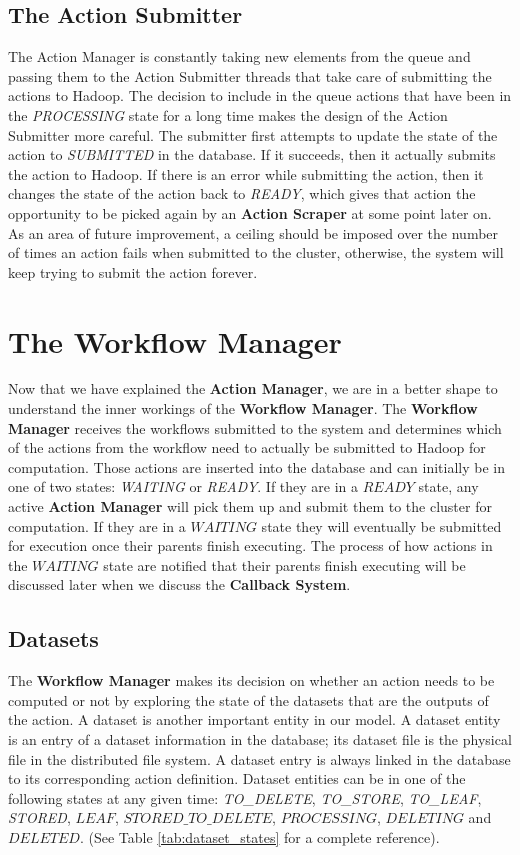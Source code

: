 \subsection{The Action Submitter}
The Action Manager is constantly taking new elements from the queue and passing them to the Action Submitter threads that take care of submitting the actions to Hadoop. The decision to include in the queue actions that have been in the \textit{PROCESSING} state for a long time makes the design of the Action Submitter more careful. The submitter first attempts to update the state of the action to \textit{SUBMITTED} in the database. If it succeeds, then it actually submits the action to Hadoop. If there is an error while submitting the action, then it changes the state of the action back to \textit{READY}, which gives that action the opportunity to be picked again by an \textbf{Action Scraper} at some point later on. As an area of future improvement, a ceiling should be imposed over the number of times an action fails when submitted to the cluster, otherwise, the system will keep trying to submit the action forever.

\section{The Workflow Manager}
Now that we have explained the \textbf{Action Manager}, we are in a better shape to understand the inner workings of the \textbf{Workflow Manager}. The \textbf{Workflow Manager} receives the workflows submitted to the system and determines which of the actions from the workflow need to actually be submitted to Hadoop for computation. Those actions are inserted into the database and can initially be in one of two states: \textit{WAITING} or \textit{READY}. If they are in a $READY$ state, any active \textbf{Action Manager} will pick them up and submit them to the cluster for computation. If they are in a $WAITING$ state they will eventually be submitted for execution once their parents finish executing. The process of how actions in the $WAITING$ state are notified that their parents finish executing will be discussed later when we discuss the \textbf{Callback System}.

\subsection{Datasets}
The \textbf{Workflow Manager} makes its decision on whether an action needs to be computed or not by exploring the state of the datasets that are the outputs of the action. A dataset is another important entity in our model. A dataset entity is an entry of a dataset information in the database; its dataset file is the physical file in the distributed file system. A dataset entry is always linked in the database to its corresponding action definition. Dataset entities can be in one of the following states at any given time: \textit{TO\_DELETE}, \textit{TO\_STORE}, \textit{TO\_LEAF}, \textit{STORED}, $LEAF$, $STORED\_TO\_DELETE$, $PROCESSING$, $DELETING$ and $DELETED$. (See Table \ref{tab:dataset_states} for a complete reference).

